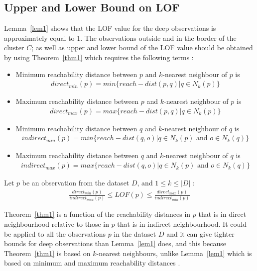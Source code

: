 \subsection{Upper and Lower Bound on LOF}
Lemma~\ref{lem1} shows that the LOF value for the deep observations is approximately equal to 1. The observations outside and in the border of the cluster $C$; as well as upper and lower bound of the LOF value should be obtained by using Theorem~\ref{thm1} which requires the following terms \citep{Markus}:
\begin{itemize}
\item{Minimum reachability distance between $p$ and $k$-nearest neighbour of $p$ is}
\begin{align}
direct_{min}(p) = min \lbrace reach-dist(p,q) | q \in N_{k}(p) \rbrace
\end{align}
\item{Maximum reachability distance between $p$ and $k$-nearest neighbour of $p$ is}
\begin{align}
direct_{max}(p) = max \lbrace reach-dist(p,q) | q \in N_{k}(p) \rbrace
\end{align}
\item{Minimum reachability distance between $q$ and $k$-nearest neighbour of $q$ is}
\begin{align}
indirect_{min}(p) = min \lbrace reach-dist(q,o) | q \in N_{k}(p) \text{ and } o \in N_{k}(q) \rbrace
\end{align}
\item{Maximum reachability distance between $q$ and $k$-nearest neighbour of $q$ is}
\begin{align}
indirect_{max}(p) = max \lbrace reach-dist(q,o) | q \in N_{k}(p) \text{ and } o \in N_{k}(q) \rbrace
\end{align}
\end{itemize}
\begin{thm}\label{thm1}
Let $p$ be an observation from the dataset $D$, and $1 \leq k \leq |D|$ \citep{Markus}:
\begin{align}
\frac{direct_{min}(p)}{indirect_{max}(p)} \leq LOF(p) \leq \frac{direct_{max}(p)}{indirect_{min}(p)}
\end{align}
\end{thm}
Theorem~\ref{thm1} is a function of the reachability distances in $p$ that is in direct neighbourhood relative to those in $p$ that is in indirect neighbourhood. It could be applied to all the observations $p$ in the dataset $D$ and it can give tighter bounds for deep observations than Lemma~\ref{lem1} does, and this because Theorem~\ref{thm1} is based on $k$-nearest neighbours, unlike Lemma~\ref{lem1} which is based on minimum and maximum reachability distances \citep{Markus}.
